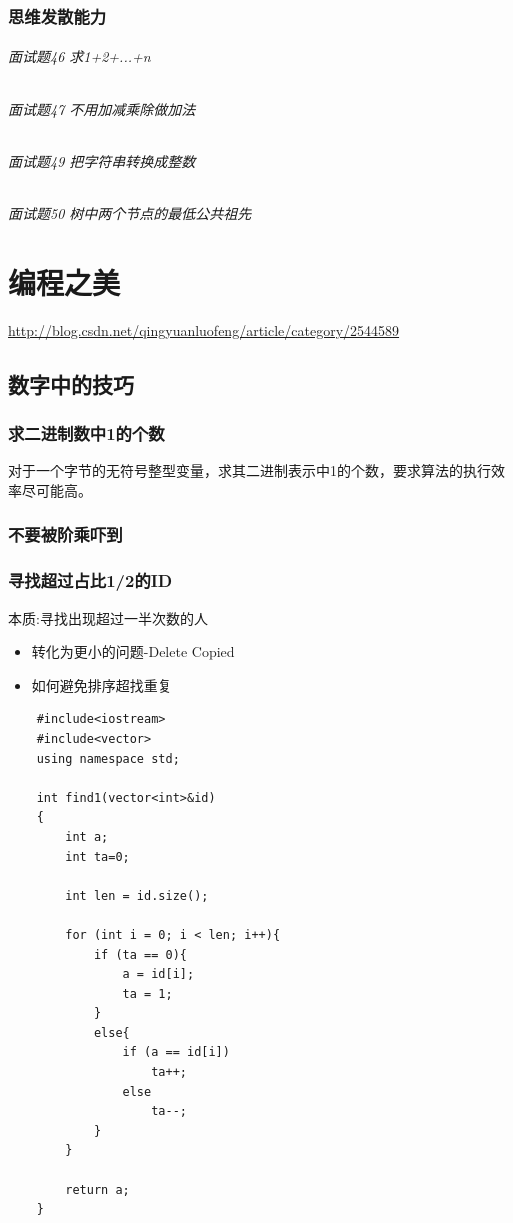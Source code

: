 \documentclass[UTF8,a4paper,12pt]{ctexbook}
\begin{document}
		\subsection{思维发散能力}
			\subparagraph{面试题46 求1+2+...+n}
			
			\subparagraph{面试题47 不用加减乘除做加法}
			
			\subparagraph{面试题49 把字符串转换成整数}
			
			\subparagraph{面试题50 树中两个节点的最低公共祖先}
			
		
\chapter{编程之美}
	\url{http://blog.csdn.net/qingyuanluofeng/article/category/2544589}
	\section{数字中的技巧}
		\subsection{求二进制数中1的个数 }
			对于一个字节的无符号整型变量，求其二进制表示中1的个数，要求算法的执行效率尽可能高。
			
			
		\subsection{不要被阶乘吓到}
		
		\subsection{寻找超过占比1/2的ID }
			本质:寻找出现超过一半次数的人 
			
			\begin{itemize}
				\item 转化为更小的问题-Delete Copied
				\item 如何避免排序超找重复
			\end{itemize}
			
			\begin{lstlisting}
	#include<iostream>
	#include<vector>
	using namespace std;
	
	int find1(vector<int>&id)
	{
		int a;
		int ta=0;
		
		int len = id.size();
		
		for (int i = 0; i < len; i++){
			if (ta == 0){
				a = id[i];
				ta = 1;
			}
			else{
				if (a == id[i])
					ta++;
				else
					ta--;
			}
		}
		
		return a;
	}
			\end{lstlisting}
\end{document}
